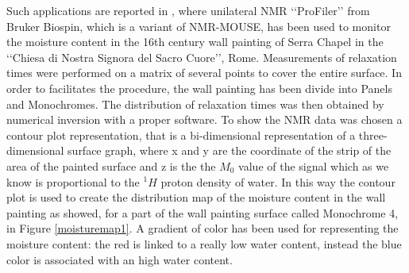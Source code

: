 \documentclass[a4paper,11pt]{report}
\begin{document}
Such applications are reported in \cite{trefresco}, where unilateral NMR ‘‘ProFiler’’ from Bruker Biospin, which is a variant of NMR-MOUSE, has been used to monitor the moisture content in the 16th century wall painting of Serra Chapel in the ‘‘Chiesa di Nostra Signora del Sacro Cuore’’, Rome. Measurements of relaxation times were performed on a matrix of several points to cover the entire surface. In order to facilitates the procedure, the wall painting has been divide into Panels and Monochromes. The distribution of relaxation times was then obtained by numerical inversion with a proper software. To show the NMR data was chosen a contour plot representation, that is a  bi-dimensional representation of a three-dimensional surface graph, where x and y are the coordinate of the strip of the area of the painted surface and z is the the $M_0$ value of the signal which as we know is proportional to the $^1H$ proton  density of water. In this way the contour plot is used to create the distribution map of the moisture content in the wall painting as showed, for a part of the wall painting surface called Monochrome 4, in Figure \ref{moisturemap1}. A gradient of color has been used for representing the moisture content: the red is linked to a really low water content, instead the blue color is associated with an high water content.
\end{document}
